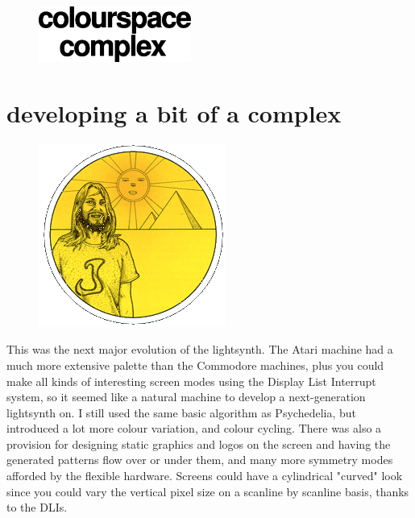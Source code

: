 \clearpage
\blankpage
\vspace*{\fill}
\begin{figure}[H]
    \centering
      \includegraphics[width=5cm]{src/cover/title_page_colorspace.png}%
\end{figure}
\vspace*{\fill}
\thispagestyle{empty}%
\clearpage
\blankpage

\chapter{developing a bit of a complex}
\begin{definition}
\setlength{\intextsep}{0pt}%
\setlength{\columnsep}{3pt}%
\begin{figure}
\includegraphics[width=\linewidth]{src/callout/psych.png} 
\end{figure}
\small
This was the next major evolution of the lightsynth. The Atari machine had a
  much more extensive palette than the Commodore machines, plus you could make
  all kinds of interesting screen modes using the Display List Interrupt
  system, so it seemed like a natural machine to develop a next-generation
  lightsynth on. I still used the same basic algorithm as Psychedelia, but
  introduced a lot more colour variation, and colour cycling. There was also a
  provision for designing static graphics and logos on the screen and having
  the generated patterns flow over or under them, and many more symmetry modes
  afforded by the flexible hardware. Screens could have a cylindrical "curved"
  look since you could vary the vertical pixel size on a scanline by scanline
  basis, thanks to the DLIs.
\end{definition}
